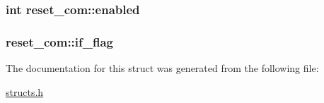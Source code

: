 \hypertarget{structreset__com_a369ae25ef1e17e4ae30d54d94c095cfd}{
\subsubsection[{enabled}]{\setlength{\rightskip}{0pt plus 5cm}int reset\-\_\-com\-::enabled}}\label{structreset__com_a369ae25ef1e17e4ae30d54d94c095cfd}
\hypertarget{structreset__com_a255ba6742e464970df5f61fc9b8ccdf2}{
\subsubsection[{if\-\_\-flag}]{ reset\-\_\-com\-::if\-\_\-flag}}\label{structreset__com_a255ba6742e464970df5f61fc9b8ccdf2}


The documentation for this struct was generated from the following file\-:\begin{DoxyCompactItemize}
\item 
\hyperlink{structs_8h}{structs.\-h}\end{DoxyCompactItemize}

